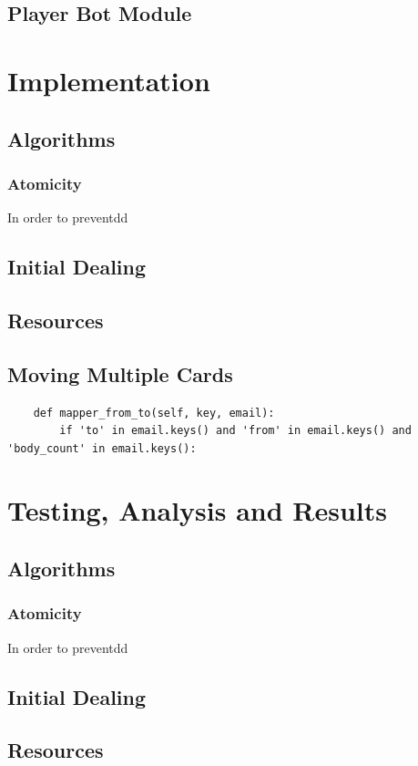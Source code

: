 \documentclass[runningheads,a4paper]{llncs}
\begin{document}
\subsection{Player Bot Module}


\section{Implementation}
\label{sec:3_implementation}
\subsection{Algorithms}
\subsubsection{Atomicity}
In order to preventdd
\subsection{Initial Dealing}
\subsection{Resources}
\subsection{Moving Multiple Cards}

\begin{verbatim}
    def mapper_from_to(self, key, email):
        if 'to' in email.keys() and 'from' in email.keys() and 'body_count' in email.keys():
\end{verbatim}

\section{Testing, Analysis and Results}
\label{sec:3_implementation}
\subsection{Algorithms}
\subsubsection{Atomicity}
In order to preventdd
\subsection{Initial Dealing}
\subsection{Resources}
\end{document}
